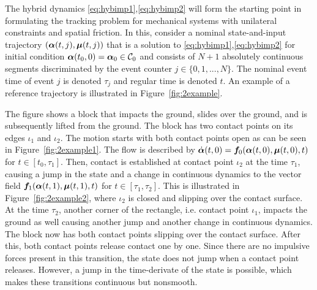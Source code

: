 \documentclass[../DC2017114Bouma.tex]{subfiles}
\begin{document}
The hybrid dynamics \eqref{eq:hybimp1},\eqref{eq:hybimp2} will form the starting point in formulating the tracking problem for mechanical systems with unilateral constraints and spatial friction. In this, consider a nominal state-and-input trajectory $(\boldsymbol{\alpha}(t,j),\boldsymbol{\mu}(t,j))$ that is a solution to \eqref{eq:hybimp1},\eqref{eq:hybimp2} for initial condition $\boldsymbol{\alpha}(t_0,0) = \boldsymbol{\alpha}_0\in \mathcal{C}_0$ and consists of $N+1$ absolutely continuous segments discriminated by the event counter $j\in\{0,1,...,N\}$. The nominal event time of event $j$ is denoted $\tau_j$ and regular time is denoted $t$. An example of a reference trajectory is illustrated in Figure~\ref{fig:2example}.

The figure shows a block that impacts the ground, slides over the ground, and is subsequently lifted from the ground. The block has two contact points on its edges $\iota_1$ and $\iota_2$. The motion starts with both contact points open as can be seen in Figure~\ref{fig:2example1}. The flow is described by $\dot{\boldsymbol{\alpha}}(t,0) = {\boldsymbol{f}}_0(\boldsymbol{\alpha}(t,0),\boldsymbol{\mu}(t,0),t)$ for $t\in[t_0,\tau_1]$. Then, contact is established at contact point $\iota_2$ at the time $\tau_1$, causing a jump in the state and a change in continuous dynamics to the vector field ${\boldsymbol{f}}_1(\boldsymbol{\alpha}(t,1),\boldsymbol{\mu}(t,1),t)$ for $t\in[\tau_1,\tau_2]$. This is illustrated in Figure~\ref{fig:2example2}, where $\iota_2$ is closed and slipping over the contact surface. At the time $\tau_2$, another corner of the rectangle, i.e. contact point $\iota_1$, impacts the ground as well causing another jump and another change in continuous dynamics. The block now has both contact points slipping over the contact surface. After this, both contact points release contact one by one. Since there are no impulsive forces present in this transition, the state does not jump when a contact point releases. However, a jump in the time-derivate of the state is possible, which makes these transitions continuous but nonsmooth.
\end{document}
